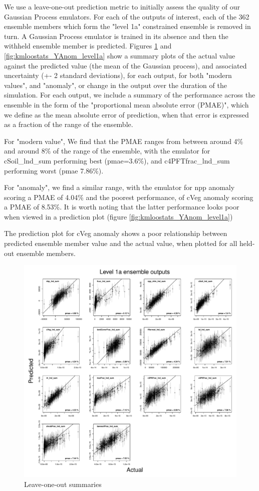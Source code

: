 \documentclass[gmd, manuscript]{copernicus}
\begin{document}
We use a leave-one-out prediction metric to initially assess the quality of our Gaussian Process emulators. For each of the outputs of interest, each of the 362 ensemble members which form the "level 1a" constrained ensemble is removed in turn. A Gaussian Process emulator is trained in its absence and then the withheld ensemble member is predicted. Figures \ref{fig:kmloostats_Y_level1a} and \ref{fig:kmloostats_YAnom_level1a}  show a summary plots of the actual value against the predicted value (the mean of the Gaussian process), and associated uncertainty (+- 2 standard deviations), for each output, for both "modern values", and "anomaly", or change in the output over the duration of the simulation. For each output, we include a summary of the performance across the ensemble in the form of the "proportional mean absolute error (PMAE)", which we define as the mean absolute error of prediction, when that error is expressed as a fraction of the range of the ensemble.

For "modern value", We find that the PMAE ranges from between around 4\% and around 8\% of the range of the ensemble, with the emulator for cSoil\_lnd\_sum performing best (pmae=3.6\%), and c4PFTfrac\_lnd\_sum performing worst (pmae  7.86\%).

For "anomaly", we find a similar range, with the emulator for npp anomaly scoring a PMAE of 4.04\% and the poorest performance, of cVeg anomaly scoring a PMAE of 8.53\%. It is worth noting that the latter performance looks poor when viewed in a prediction plot (figure \ref{fig:kmloostats_YAnom_level1a}) 

The prediction plot for cVeg anomaly shows a poor relationship between predicted ensemble member value and the actual value, when plotted for all held-out ensemble members.

%
\begin{figure}[t]
\includegraphics[width=12cm]{./graphics/kmloostats_Y_level1a.pdf}
\caption{Leave-one-out summaries }
\label{fig:kmloostats_Y_level1a}
\end{figure}
\end{document}
